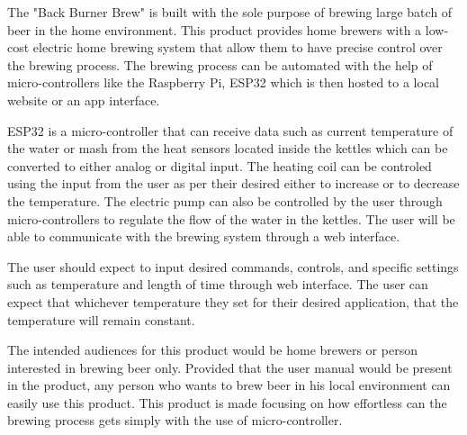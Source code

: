 The "Back Burner Brew" is built with the sole purpose of brewing large batch of beer in the home environment. This product provides home brewers with a low-cost electric home brewing system that allow them to have precise control over the brewing process. The brewing process can be automated with the help of micro-controllers like the Raspberry Pi, ESP32 which is then hosted to a local website or an app interface.

ESP32 is a micro-controller that can receive data such as current temperature of the water or mash from the heat sensors located inside the kettles which can be converted to either analog or digital input. The heating coil can be controled using the input from the user as per their desired either to increase or to decrease the temperature. The electric pump can also be controlled by the user through micro-controllers to regulate the flow of the water in the kettles. The user will be able to communicate with the brewing system through a web interface.

The user should expect to input desired commands, controls, and specific
settings such as temperature and length of time through web interface.
The user can expect that whichever temperature they set for their desired
application, that the temperature will remain constant.

The intended audiences for this product would be home brewers or person interested in brewing beer only. Provided that the user manual would be present in the product, any person who wants to brew beer in his local environment can easily use this product. This product is made focusing on how effortless can the brewing process gets simply with the use of micro-controller.